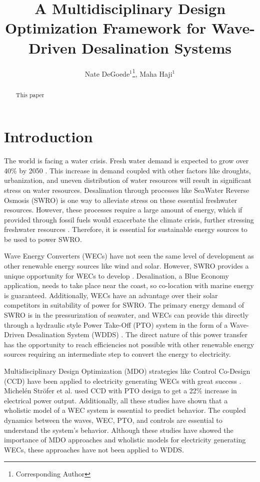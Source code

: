 \documentclass[twocolumn,10pt]{asme2e}
\title{ \vspace{-10 mm} A Multidisciplinary Design Optimization Framework for Wave-Driven Desalination Systems}
\author{Nate DeGoede$^1$\thanks{Corresponding Author}, Maha Haji$^1$
    \affiliation{
	$^1$Sibley School of Mechanical and Aerospace Engineering\\
	Cornell University\\
	Ithaca, New York 14853\\
    Email: \{njd76, maha\}@cornell.edu 
    }
}
\begin{document}
\maketitle
\setlength{\abovedisplayskip}{10pt}
\setlength{\belowdisplayskip}{10pt}

\begin{abstract}

This paper
\end{abstract}


\section{Introduction}

The world is facing a water crisis. Fresh water demand is expected to grow over 40\% by 2050 \cite{watershortage2015}. This increase in demand coupled with other factors like droughts, urbanization, and uneven distribution of water resources will result in significant stress on water resources. Desalination through processes like SeaWater Reverse Osmosis (SWRO) is one way to alleviate stress on these essential freshwater resources. However, these processes require a large amount of energy, which if provided through fossil fuels would exacerbate the climate crisis, further stressing freshwater resources \cite{nytdrought}. Therefore, it is essential for sustainable energy sources to be used to power SWRO. 

Wave Energy Converters (WECs) have not seen the same level of development as other renewable energy sources like wind and solar. However, SWRO provides a unique opportunity for WECs to develop \cite{blue_econ}. Desalination, a Blue Economy application, needs to take place near the coast, so co-location with marine energy is guaranteed. Additionally, WECs have an advantage over their solar competitors in suitability of power for SWRO. The primary energy demand of SWRO is in the pressurization of seawater, and WECs can provide this directly through a hydraulic style Power Take-Off (PTO) system in the form of a Wave-Driven Desalination System (WDDS) \cite{Davies2005}. The direct nature of this power transfer has the opportunity to reach efficiencies not possible with other renewable energy sources requiring an intermediate step to convert the energy to electricity. 

Multidisciplinary Design Optimization (MDO) strategies like Control Co-Design (CCD) have been applied to electricity generating WECs with great success \cite{Stroefer2023,PenaSanchez2022,Rosati2023,Grasberger2024}. Michelén Ströfer et al. used CCD with PTO design to get a 22\% increase in electrical power output. Additionally, all these studies have shown that a wholistic model of a WEC system is essential to predict behavior. The coupled dynamics between the waves, WEC, PTO, and controls are essential to understand the system's behavior. Although these studies have showed the importance of MDO approaches and wholistic models for electricity generating WECs, these approaches have not been applied to WDDS.
\end{document}
